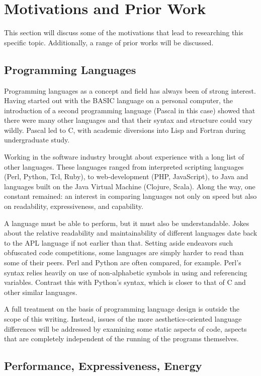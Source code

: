 \section{Motivations and Prior Work}
\label{sec:motivations}

This section will discuss some of the motivations that lead to researching this specific topic. Additionally, a range of prior works will be discussed.

\subsection{Programming Languages}

Programming languages as a concept and field has always been of strong interest. Having started out with the BASIC language on a personal computer, the introduction of a second programming language (Pascal in this case) showed that there were many other languages and that their syntax and structure could vary wildly. Pascal led to C, with academic diversions into Lisp and Fortran during undergraduate study.

Working in the software industry brought about experience with a long list of other languages. These languages ranged from interpreted scripting languages (Perl, Python, Tcl, Ruby), to web-development (PHP, JavaScript), to Java and languages built on the Java Virtual Machine (Clojure, Scala). Along the way, one constant remained: an interest in comparing languages not only on speed but also on readability, expressiveness, and capability.

A language must be able to perform, but it must also be understandable. Jokes about the relative readability and maintainability of different languages date back to the APL language if not earlier than that. Setting aside endeavors such obfuscated code competitions, some languages are simply harder to read than some of their peers. Perl and Python are often compared, for example. Perl's syntax relies heavily on use of non-alphabetic symbols in using and referencing variables. Contrast this with Python's syntax, which is closer to that of C and other similar languages.

A full treatment on the basis of programming language design is outside the scope of this writing. Instead, issues of the more aesthetics-oriented language differences will be addressed by examining some static aspects of code, aspects that are completely independent of the running of the programs themselves.

\subsection{Performance, Expressiveness, Energy}

